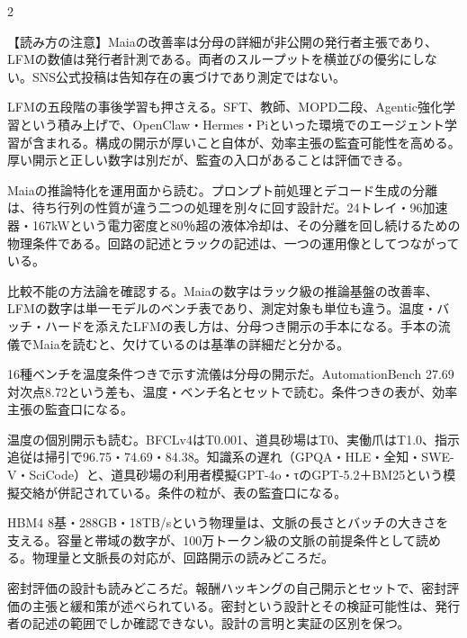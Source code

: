 \documentclass[lualatex,a4paper,10pt]{jlreq}
\begin{document}
\begin{multicols}{2} %

\begin{tcolorbox}[colback=SurveySoft,colframe=SurveyRule,arc=1mm,boxrule=0.4pt,left=2mm,right=2mm]
【読み方の注意】Maiaの改善率は分母の詳細が非公開の発行者主張であり、LFMの数値は発行者計測である。両者のスループットを横並びの優劣にしない。SNS公式投稿は告知存在の裏づけであり測定ではない。
\end{tcolorbox}
\cite{B09,B66,B10,B67,B68,B11,B69,B12}

LFMの五段階の事後学習も押さえる。SFT、教師、MOPD二段、Agentic強化学習という積み上げで、OpenClaw・Hermes・Piといった環境でのエージェント学習が含まれる。構成の開示が厚いこと自体が、効率主張の監査可能性を高める。厚い開示と正しい数字は別だが、監査の入口があることは評価できる。
\cite{B11,B69,B12}


Maiaの推論特化を運用面から読む。プロンプト前処理とデコード生成の分離は、待ち行列の性質が違う二つの処理を別々に回す設計だ。24トレイ・96加速器・167kWという電力密度と80％超の液体冷却は、その分離を回し続けるための物理条件である。回路の記述とラックの記述は、一つの運用像としてつながっている。
\cite{B09,B66,B10,B67,B68}


比較不能の方法論を確認する。Maiaの数字はラック級の推論基盤の改善率、LFMの数字は単一モデルのベンチ表であり、測定対象も単位も違う。温度・バッチ・ハードを添えたLFMの表し方は、分母つき開示の手本になる。手本の流儀でMaiaを読むと、欠けているのは基準の詳細だと分かる。
\cite{B09,B66,B10,B67,B68,B11,B69,B12}


16種ベンチを温度条件つきで示す流儀は分母の開示だ。AutomationBench 27.69対次点8.72という差も、温度・ベンチ名とセットで読む。条件つきの表が、効率主張の監査口になる。
\cite{B11,B69,B12}


温度の個別開示も読む。BFCLv4はT0.001、道具砂場はT0、実働爪はT1.0、指示追従は掃引で96.75・74.69・84.38。知識系の遅れ（GPQA・HLE・全知・SWE-V・SciCode）と、道具砂場の利用者模擬GPT-4o・τのGPT-5.2＋BM25という模擬交絡が併記されている。条件の粒が、表の監査口になる。
\cite{B11,B69,B12}


HBM4 8基・288GB・18TB/sという物理量は、文脈の長さとバッチの大きさを支える。容量と帯域の数字が、100万トークン級の文脈の前提条件として読める。物理量と文脈長の対応が、回路開示の読みどころだ。
\cite{B09,B66,B10,B67,B68}


密封評価の設計も読みどころだ。報酬ハッキングの自己開示とセットで、密封評価の主張と緩和策が述べられている。密封という設計とその検証可能性は、発行者の記述の範囲でしか確認できない。設計の言明と実証の区別を保つ。
\cite{B11,B69,B12}



\end{multicols}
\end{document}
